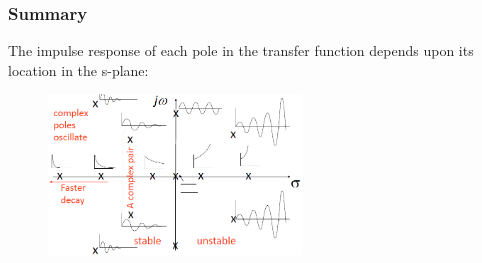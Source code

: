 \documentclass[class=report, crop=false, 12pt,a4paper]{standalone}
\begin{document}
\subsubsection{Summary}
The impulse response of each pole in the transfer function depends upon its location in the s-plane:
\begin{figure}[H]
  \centering
  \includegraphics[width = 0.6\textwidth]{../img/diagram93.png}
\end{figure}
\end{document}
